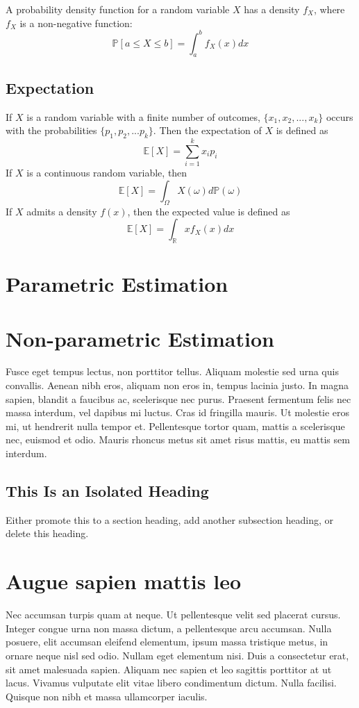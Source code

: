 A probability density function for a random variable $X$ has a density $f_X$, where $f_X$ is a non-negative function:
\begin{equation}
  \mathbb{P}[a \leq X \leq b]=\int_{a}^{b}f_{X}(x)dx
\end{equation}

\subsection{Expectation}
If $X$ is a random variable with a finite number of outcomes, $\{x_1,x_2,...,x_k\}$ occurs with the probabilities $\{p_1,p_2,...p_k\}$.  Then the expectation of $X$ is defined as
\begin{equation}
  \mathbb{E}[X]=\sum_{i=1}^{k}x_i p_i
\end{equation}
If $X$ is a continuous random variable, then
\begin{equation}
  \mathbb{E}[X]=\int_{\Omega} X(\omega) d\mathbb{P}(\omega)
\end{equation}
If $X$ admits a density $f(x)$, then the expected value is defined as
\begin{equation}
  \mathbb{E}[X]=\int_{\mathbb{R}}x f_{X}(x) dx
\end{equation}


\section{Parametric Estimation}

\section{Non-parametric Estimation}
 Fusce eget tempus lectus, non porttitor tellus. Aliquam molestie sed urna quis convallis. Aenean nibh eros, aliquam non eros in, tempus lacinia justo. In magna sapien, blandit a faucibus ac, scelerisque nec purus. Praesent fermentum felis nec massa interdum, vel dapibus mi luctus. Cras id fringilla mauris. Ut molestie eros mi, ut hendrerit nulla tempor et. Pellentesque tortor quam, mattis a scelerisque nec, euismod et odio. Mauris rhoncus metus sit amet risus mattis, eu mattis sem interdum.

\subsection{This Is an Isolated Heading}
Either promote this to a section heading, add another subsection heading, or delete this heading.

\section{Augue sapien mattis leo}
Nec accumsan turpis quam at neque. Ut pellentesque velit sed placerat cursus. Integer congue urna non massa dictum, a pellentesque arcu accumsan. Nulla posuere, elit accumsan eleifend elementum, ipsum massa tristique metus, in ornare neque nisl sed odio. Nullam eget elementum nisi. Duis a consectetur erat, sit amet malesuada sapien. Aliquam nec sapien et leo sagittis porttitor at ut lacus. Vivamus vulputate elit vitae libero condimentum dictum. Nulla facilisi. Quisque non nibh et massa ullamcorper iaculis.
